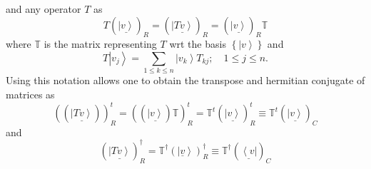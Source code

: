 \documentclass[aps,preprint]{revtex4}%
\begin{document}
and any operator $T$ as
\begin{equation}
T\left(  \underline{\left\vert v\right\rangle }\right)  _{R}=\left(
\underline{\left\vert Tv\right\rangle }\right)  _{R}=\left(  \underline
{\left\vert v\right\rangle }\right)  _{R}\mathbb{T}%
\end{equation}
where $\mathbb{T}$ is the matrix representing $T$ wrt the basis $\left\{
\left\vert v\right\rangle \right\}  $ and
\begin{equation}
T\left\vert v_{j}\right\rangle =%
{\displaystyle\sum\limits_{1\leq k\leq n}}
\left\vert v_{k}\right\rangle T_{kj};\quad1\leq j\leq n.
\end{equation}
Using this notation allows one to obtain the transpose and hermitian conjugate
of matrices as
\begin{equation}
\left(  \left(  \underline{\left\vert Tv\right\rangle }\right)  \right)
_{R}^{t}=\left(  \left(  \underline{\left\vert v\right\rangle }\right)
\mathbb{T}\right)  _{R}^{t}=\mathbb{T}^{t}\left(  \underline{\left\vert
v\right\rangle }\right)  _{R}^{t}\equiv\mathbb{T}^{t}\left(  \underline
{\left\vert v\right\rangle }\right)  _{C}%
\end{equation}
and
\begin{equation}
\left(  \underline{\left\vert Tv\right\rangle }\right)  _{R}^{\dagger
}=\mathbb{T}^{\dagger}\left(  \left\vert \underline{v}\right\rangle \right)
_{R}^{\dagger}\equiv\mathbb{T}^{\dagger}\left(  \underline{\left\langle
v\right\vert }\right)  _{C}%
\end{equation}
\end{document}
